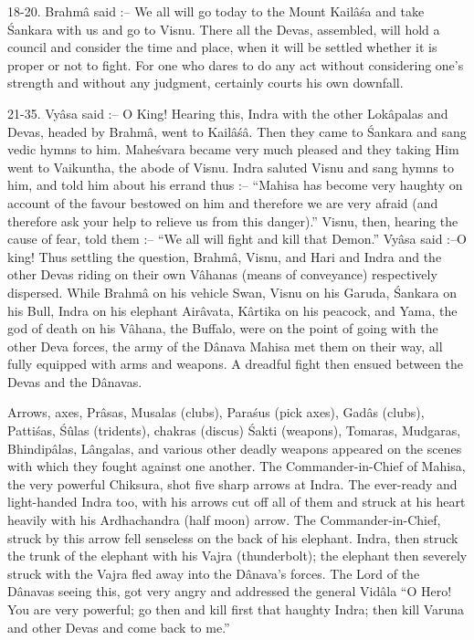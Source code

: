 18-20. Brahm\^a said :-- We all will go today to the Mount Kail\^a\'sa and take \'Sankara with us and go to Visnu. There all the Devas, assembled, will hold a council and consider the time and place, when it will be settled whether it is proper or not to fight. For one who dares to do any act without considering one's strength and without any judgment, certainly courts his own downfall.

21-35. Vy\^asa said :-- O King! Hearing this, Indra with the other Lok\^apalas and Devas, headed by Brahm\^a, went to Kail\^a\'s\^a. Then they came to \'Sankara and sang vedic hymns to him. Mahe\'svara became very much pleased and they taking Him went to Vaikuntha, the abode of Visnu. Indra saluted Visnu and sang hymns to him, and told him about his errand thus :-- ``Mahisa has become very haughty on account of the favour bestowed on him and therefore we are very afraid (and therefore ask your help to relieve us from this danger).'' Visnu, then, hearing the cause of fear, told them :-- ``We all will fight and kill that Demon.'' Vy\^asa said :--O king! Thus settling the question, Brahm\^a, Visnu, and Hari and Indra and the other Devas riding on their own V\^ahanas (means of conveyance) respectively dispersed. While Brahm\^a on his vehicle Swan, Visnu on his Garuda, \'Sankara on his Bull, Indra on his elephant Air\^avata, K\^artika on his peacock, and Yama, the god of death on his V\^ahana, the Buffalo, were on the point of going with the other Deva forces, the army of the D\^anava Mahisa met them on their way, all fully equipped with arms and weapons. A dreadful fight then ensued between the Devas and the D\^anavas.

Arrows, axes, Pr\^asas, Musalas (clubs), Para\'sus (pick axes), Gad\^as (clubs), Patti\'sas, \'S\^ulas (tridents), chakras (discus) \'Sakti (weapons), Tomaras, Mudgaras, Bhindip\^alas, L\^angalas, and various other deadly weapons appeared on the scenes with which they fought against one another. The Commander-in-Chief of Mahisa, the very powerful Chiksura, shot five sharp arrows at Indra. The ever-ready and light-handed Indra too, with his arrows cut off all of them and struck at his heart heavily with his Ardhachandra (half moon) arrow. The Commander-in-Chief, struck by this arrow fell senseless on the back of his elephant. Indra, then struck the trunk of the elephant with his Vajra (thunderbolt); the elephant then severely struck with the Vajra fled away into the D\^anava's forces. The Lord of the D\^anavas seeing this, got very angry and addressed the general Vid\^ala ``O Hero! You are very powerful; go then and kill first that haughty Indra; then kill Varuna and other Devas and come back to me.''

